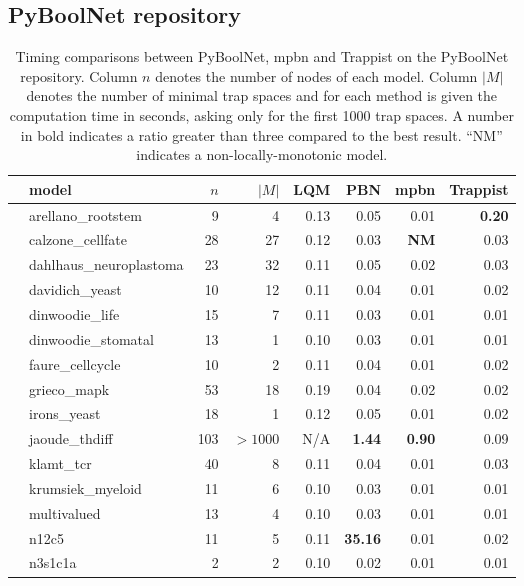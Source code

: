 \documentclass[preprint,12pt]{elsarticle}
\newcounter{rownumber}
\newcommand\rownb{\stepcounter{rownumber}\arabic{rownumber}}
\begin{document}
\subsection{PyBoolNet repository}

\setlength{\tabcolsep}{4pt}
\begin{table}[!htb]
  \caption{Timing comparisons between PyBoolNet, mpbn and Trappist on the PyBoolNet repository.
    Column \(n\) denotes the number of nodes of each model. Column \(|M|\) denotes the number of minimal trap spaces and for each method is given the computation time in seconds, asking only for the first 1000 trap spaces.
    A number in bold indicates a ratio greater than three compared to the best result. ``NM'' indicates a non-locally-monotonic model.}
  \centering%
  \label{tab:pyboolnet_repo}
  \begin{tabular}{rlrrrrrr}
    \toprule
    & model & $n$ & $|M|$ & LQM & PBN & mpbn & Trappist \\ \midrule
    \rownb & arellano\_rootstem & 9 & 4 & 0.13 & 0.05 & 0.01 & \textbf{0.20}\\
    \rownb & calzone\_cellfate & 28 & 27 & 0.12 & 0.03 & \textbf{NM} & 0.03\\
    \rownb & dahlhaus\_neuroplastoma & 23 & 32 & 0.11 & 0.05 & 0.02 & 0.03\\
    \rownb & davidich\_yeast & 10 & 12 & 0.11 & 0.04 & 0.01 & 0.02\\
    \rownb & dinwoodie\_life & 15 & 7 & 0.11 & 0.03 & 0.01 & 0.01\\
    \rownb & dinwoodie\_stomatal & 13 & 1 & 0.10 & 0.03 & 0.01 & 0.01\\
    \rownb & faure\_cellcycle & 10 & 2 & 0.11 & 0.04 & 0.01 & 0.02\\
    \rownb & grieco\_mapk & 53 & 18 & 0.19 & 0.04 & 0.02 & 0.02\\
    \rownb & irons\_yeast & 18 & 1 & 0.12 & 0.05 & 0.01 & 0.02\\
    \rownb & jaoude\_thdiff & 103 & $>1000$ & N/A & \textbf{1.44} & \textbf{0.90} & 0.09\\
    \rownb & klamt\_tcr & 40 & 8 & 0.11 & 0.04 & 0.01 & 0.03\\
    \rownb & krumsiek\_myeloid & 11 & 6 & 0.10 & 0.03 & 0.01 & 0.01\\
    \rownb & multivalued & 13 & 4 & 0.10 & 0.03 & 0.01 & 0.01\\
    \rownb & n12c5 & 11 & 5 & 0.11 & \textbf{35.16} & 0.01 & 0.02\\
    \rownb & n3s1c1a & 2 & 2 & 0.10 & 0.02 & 0.01 & 0.01\\

\end{tabular}
\end{table}
\end{document}
